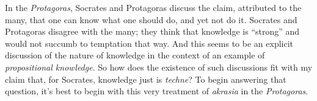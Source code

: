 ﻿\documentclass[11pt]{amsart}
\begin{document}



In the \emph{Protagoras}, Socrates and Protagoras discuss the claim, attributed to the many, that one can know what one should do, and yet not do it. Socrates and Protagoras disagree with the many; they think that knowledge is ``strong'' and would not succumb to temptation that way. And this seems to be an explicit discussion of the nature of knowledge in the context of an example of \emph{propositional knowledge}. So how does the existence of such discussions fit with my claim that, for Socrates, knowledge just is \emph{techne}? To begin answering that question, it's best to begin with this very treatment of \emph{akrasia} in the \emph{Protagoras}.
\end{document}

